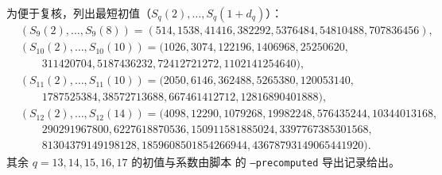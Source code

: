 

\begin{remark}[高阶递推的最短初值（\(q=9,10,11,12\)）]\label{rem:pom-moment-init-9-12}
为便于复核，列出最短初值（\(S_q(2),\dots,S_q(1+d_q)\)）：
$$
\begin{aligned}
&(S_9(2),\dots,S_9(8))=(514,1538,41416,382292,5376484,54810488,707836456),\\
&(S_{10}(2),\dots,S_{10}(10))=(1026,3074,122196,1406968,25250620,\\
&\qquad 311420704,5187436232,72412721272,1102141254640),\\
&(S_{11}(2),\dots,S_{11}(10))=(2050,6146,362488,5265380,120053140,\\
&\qquad 1787525384,38572713688,667461412712,12816890401888),\\
&(S_{12}(2),\dots,S_{12}(14))=(4098,12290,1079268,19982248,576435244,10344013168,\\
&\qquad 290291967800,6227618870536,150911581885024,3397767385301568,\\
&\qquad 81304379149198128,1859608501854266944,43678793149065441920).
\end{aligned}
$$
其余 \(q=13,14,15,16,17\) 的初值与系数由脚本  的 \texttt{--precomputed} 导出记录给出。
\end{remark}

